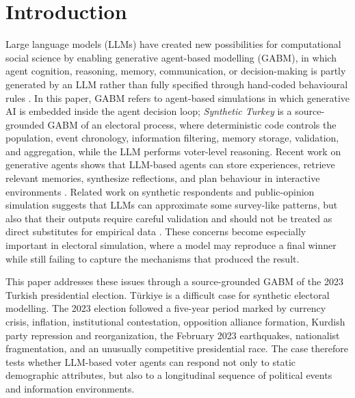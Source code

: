 \documentclass[pdflatex,sn-mathphys-num,iicol]{sn-jnl}
\begin{document}

\maketitle


\section{Introduction}\label{sec:intro}

Large language models (LLMs) have created new possibilities for computational
social science by enabling generative agent-based modelling (GABM), in which
agent cognition, reasoning, memory, communication, or decision-making is partly
generated by an LLM rather than fully specified through hand-coded behavioural
rules \cite{ghaffarzadegan2023gabm,gao2024llmabm,lu2024gabs}. In this paper,
GABM refers to agent-based simulations in which generative AI is embedded
inside the agent decision loop; \textit{Synthetic Turkey} is a source-grounded
GABM of an electoral process, where deterministic code controls the population,
event chronology, information filtering, memory storage, validation, and
aggregation, while the LLM performs voter-level reasoning. Recent work on
generative agents shows that LLM-based agents can store experiences, retrieve
relevant memories, synthesize reflections, and plan behaviour in interactive
environments \cite{park2023generative}. Related work on synthetic respondents
and public-opinion simulation suggests that LLMs can approximate some
survey-like patterns, but also that their outputs require careful validation
and should not be treated as direct substitutes for empirical data
\cite{argyle2023out,aher2023simulating,qu2024performance}. These concerns
become especially important in electoral simulation, where a model may reproduce
a final winner while still failing to capture the mechanisms that produced the
result.

This paper addresses these issues through a source-grounded GABM of the 2023
Turkish presidential election. Türkiye is a difficult case for synthetic
electoral modelling. The 2023 election followed a five-year period marked by
currency crisis, inflation, institutional contestation, opposition alliance
formation, Kurdish party repression and reorganization, the February 2023
earthquakes, nationalist fragmentation, and an unusually competitive presidential
race. The case therefore tests whether LLM-based voter agents can respond not
only to static demographic attributes, but also to a longitudinal sequence of
political events and information environments.
\end{document}
